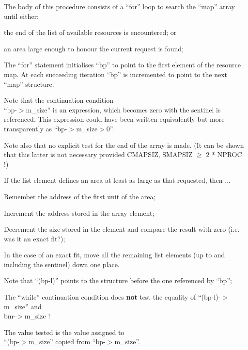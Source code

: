 The body of this procedure consists of
a ``for'' loop to search the ``map'' array
until either:

\bd
\item[(a)] the end of the list of available
 resources is encountered; or

\item[(b)] an area large enough to honour
 the current request is found;
\ed

\bd
\item[2534:] The ``for'' statement initialises
 ``bp'' to point to the first element
	of the resource map. At
 each succeeding iteration ``bp'' is
 incremented to point to the next
 ``map'' structure.
\ed

Note that the continuation condition\\
``bp-$>$m\_size'' is an expression, which becomes zero with the
sentinel is referenced. This
expression could have been written 
equivalently but more transparently as ``bp-$>$m\_size$>$0''.

Note also that no explicit test for the
end of the array is made. (It can be
shown that this latter is not necessary
provided CMAPSIZ, SMAPSIZ $\ge$ 2 * NPROC !)

\bd
\item[2535:] If the list element defines an
 area at least as large as that
 requested, then ...

\item[2536:] Remember the address of the first
 unit of the area;

\item[2537:] Increment the address stored in
 the array element;

\item[2538:] Decrement the size stored in the
 element and compare the result
 with zero (i.e. was it an exact
 fit?);

\item[2539:] In the case of an exact fit, move
 all the remaining list elements
 (up to and including the sentinel) down one place.

Note that ``(bp-l)'' points to the
structure before the one referenced by ``bp'';

\item[2542:] The ``while'' continuation condition does {\bf not}
test the equality of ``(bp-l)-$>$m\_size'' and\\
bm-$>$m\_size !


The value tested is the value assigned to\\
``(bp-$>$m\_size'' copied from ``bp-$>$m\_size''.


